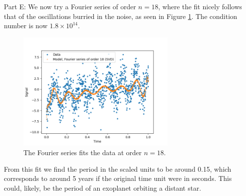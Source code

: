 \documentclass[11pt]{article}
\begin{document}
Part E: 
We now try a Fourier series of order $n=18$, where the fit nicely follows that of the oscillations burried in the noise, as seen in Figure \ref{F}. The condition number is now $1.8 \times 10^{14}$.
\begin{figure}[!htbp]
    \centering
    \includegraphics[width=0.7\textwidth]{fourier.png}
    \caption{The Fourier series fits the data at order $n=18$.}

    \label{F}
\end{figure}

From this fit we find the period in the scaled units to be around 0.15, which corresponds to around 5 years if the original time unit were in seconds. This could, likely, be the period of an exoplanet orbiting a distant star. 
\end{document}
